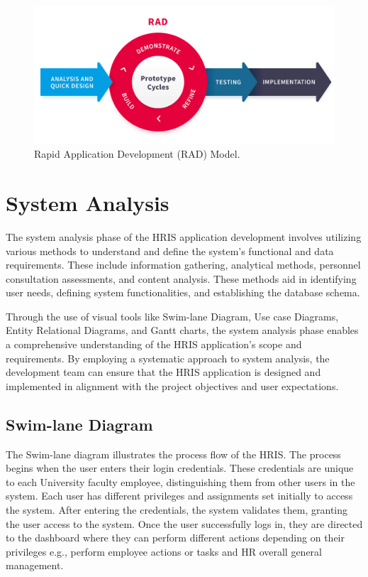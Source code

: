 \begin{figure}[H]
    \centering
    \includegraphics[width=1\linewidth]{figures/images/doc/rad.png}
    \caption{Rapid Application Development (RAD) Model.}
    \label{fig:rad}
\end{figure}
    
\section{System Analysis}
The system analysis phase of the HRIS application development involves utilizing various methods to understand and define the system's functional and data requirements. These include information gathering, analytical methods, personnel consultation assessments, and content analysis. These methods aid in identifying user needs, defining system functionalities, and establishing the database schema. 

Through the use of visual tools like Swim-lane Diagram, Use case Diagrams, Entity Relational Diagrams, and Gantt charts, the system analysis phase enables a comprehensive understanding of the HRIS application's scope and requirements. By employing a systematic approach to system analysis, the development team can ensure that the HRIS application is designed and implemented in alignment with the project objectives and user expectations.

    \subsection{Swim-lane Diagram}
    The Swim-lane diagram illustrates the process flow of the HRIS. The process begins when the user enters their login credentials. These credentials are unique to each University faculty employee, distinguishing them from other users in the system. Each user has different privileges and assignments set initially to access the system. After entering the credentials, the system validates them, granting the user access to the system. Once the user successfully logs in, they are directed to the dashboard where they can perform different actions depending on their privileges e.g., perform employee actions or tasks and HR overall general management.

